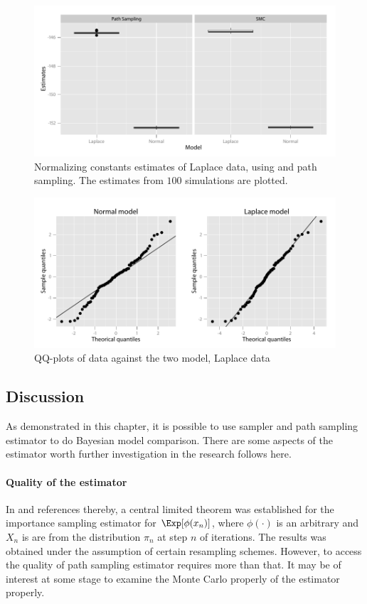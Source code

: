 \begin{figure}[htb]
  \centering
  \includegraphics{fig/5-lz}
  \caption{Normalizing constants estimates of Laplace data, using \smc and
    path sampling. The estimates from $100$ simulations are plotted.}
  \label{fig:laplace_z}
\end{figure}

\begin{figure}[htb]
  \centering
  \includegraphics{fig/5-lqq}
  \caption{QQ-plots of data against the two model, Laplace data}
  \label{fig:laplace_qq}
\end{figure}

\subsection{Discussion}
\label{sub:Discussion}

As demonstrated in this chapter, it is possible to use \smc sampler and path
sampling estimator to do Bayesian model comparison. There are some aspects of
the estimator worth further investigation in the research follows here.

\paragraph{Quality of the estimator} In \textcite{DelMoral2006} and references
thereby, a central limited theorem was established for the importance sampling
estimator for $\Exp[\phi(x_n)]$, where $\phi(\cdot)$ is an arbitrary and $X_n$
is are from the distribution $\pi_n$ at step $n$ of \smc iterations. The
results was obtained under the assumption of certain resampling schemes.
However, to access the quality of path sampling estimator requires more than
that. It may be of interest at some stage to examine the Monte Carlo properly
of the estimator properly.

